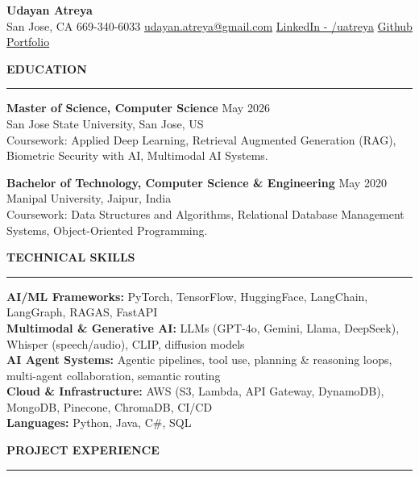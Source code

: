 \documentclass[letterpaper,10.5pt]{extarticle}
\newcommand{\resumesection}[1]{%
    \vspace{6pt}%
    \noindent\textbf{#1}\vspace{-5pt}%
    \\\noindent\rule{\textwidth}{0.5pt}%
    \vspace{1pt}%
}
\begin{document}
\begin{center}
    {\LARGE\textbf{Udayan Atreya}}\\[3pt]
    {\fontsize{11}{13.2}\selectfont
    San Jose, CA \textbar{} 669-340-6033 \textbar{}
    \href{mailto:udayan.atreya@gmail.com}{udayan.atreya@gmail.com} \textbar{}
    \href{https://www.linkedin.com/in/uatreya/}{LinkedIn - /uatreya} \textbar{}
    \href{https://github.com/slowloris-98/}{Github} \textbar{}
    \href{https://udayan-atreya.vercel.app/}{Portfolio}}
\end{center}

\resumesection{EDUCATION}

\noindent\textbf{Master of Science, Computer Science} \hfill May 2026\\
San Jose State University, San Jose, US\\
Coursework: Applied Deep Learning, Retrieval Augmented Generation (RAG), Biometric Security with AI, Multimodal AI Systems.

\vspace{3pt}

\noindent\textbf{Bachelor of Technology, Computer Science \& Engineering} \hfill May 2020\\
Manipal University, Jaipur, India\\
Coursework: Data Structures and Algorithms, Relational Database Management Systems, Object-Oriented Programming.

\resumesection{TECHNICAL SKILLS}

\noindent\textbf{AI/ML Frameworks:} PyTorch, TensorFlow, HuggingFace, LangChain, LangGraph, RAGAS, FastAPI\\
\noindent\textbf{Multimodal \& Generative AI:} LLMs (GPT-4o, Gemini, Llama, DeepSeek), Whisper (speech/audio), CLIP, diffusion models\\
\noindent\textbf{AI Agent Systems:} Agentic pipelines, tool use, planning \& reasoning loops, multi-agent collaboration, semantic routing\\
\noindent\textbf{Cloud \& Infrastructure:} AWS (S3, Lambda, API Gateway, DynamoDB), MongoDB, Pinecone, ChromaDB, CI/CD\\
\noindent\textbf{Languages:} Python, Java, C\#, SQL

\resumesection{PROJECT EXPERIENCE}
\end{document}

